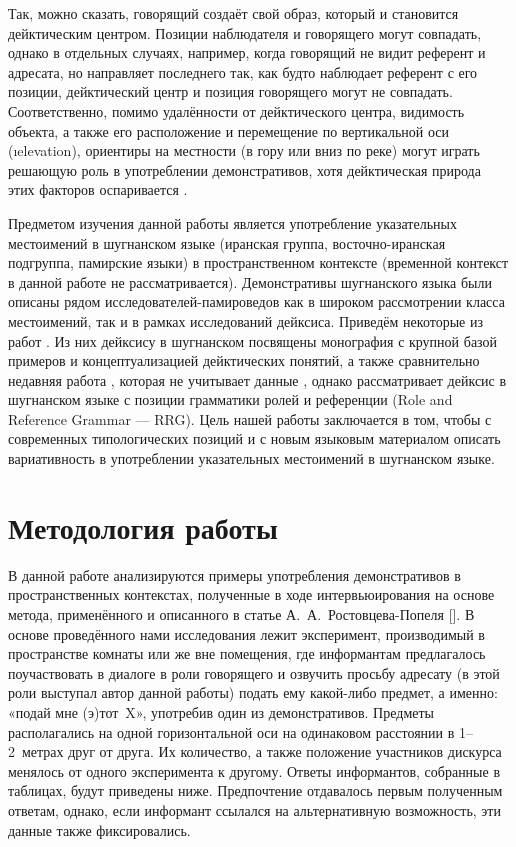 Так, можно сказать, говорящий создаёт свой образ, который и становится дейктическим центром. Позиции наблюдателя и говорящего могут совпадать, однако в отдельных случаях, например, когда говорящий не видит референт и адресата, но направляет последнего так, как будто наблюдает референт с его позиции, дейктический центр и позиция говорящего могут не совпадать. Соответственно, помимо удалённости от дейктического центра, видимость объекта, а также его расположение и перемещение по вертикальной оси (\i{elevation}), ориентиры на местности (в гору или вниз по реке) могут играть решающую роль в употреблении демонстративов, хотя дейктическая природа этих факторов оспаривается \parencite[41]{diessel1999}.

Предметом изучения данной работы является употребление указательных местоимений в шугнанском языке (иранская группа, восточно-иранская подгруппа, памирские языки) в пространственном контексте (временной контекст в данной работе не рассматривается). Демонстративы шугнанского языка были описаны рядом исследователей-памироведов как в широком рассмотрении класса местоимений, так и в рамках исследований дейксиса. Приведём некоторые из работ \parencites{karamshoev1963}{edelman1976}{belikov1972}{alamshoev1994}{yusufbekov1998}{muller2015}. Из них дейксису в шугнанском посвящены монография \parencite{yusufbekov1998} с крупной базой примеров и концептуализацией дейктических понятий, а также сравнительно недавняя работа \parencite{muller2015}, которая не учитывает данные \parencite{yusufbekov1998}, однако рассматривает дейксис в шугнанском языке с позиции грамматики ролей и референции (Role and Reference Grammar — RRG). Цель нашей работы заключается в том, чтобы с современных типологических позиций и с новым языковым материалом описать вариативность в употреблении указательных местоимений в шугнанском языке.

\section{Методология работы} \label{dem-method}

В данной работе анализируются примеры употребления демонстративов в пространственных контекстах, полученные в ходе интервьюирования на основе метода, применённого и описанного в статье А.~А.~Ростовцева-Попеля [\cite*{popiel2009}]. В основе проведённого нами исследования лежит эксперимент, производимый в пространстве комнаты или же вне помещения, где информантам предлагалось поучаствовать в диалоге в роли говорящего и озвучить просьбу адресату (в этой роли выступал автор данной работы) подать ему какой-либо предмет, а именно: «подай мне (э)тот~X», употребив один из демонстративов. Предметы располагались на одной горизонтальной оси на одинаковом расстоянии в 1–2~метрах друг от друга. Их количество, а также положение участников дискурса менялось от одного эксперимента к другому. Ответы информантов, собранные в таблицах, будут приведены ниже. Предпочтение отдавалось первым полученным ответам, однако, если информант ссылался на альтернативную возможность, эти данные также фиксировались.

